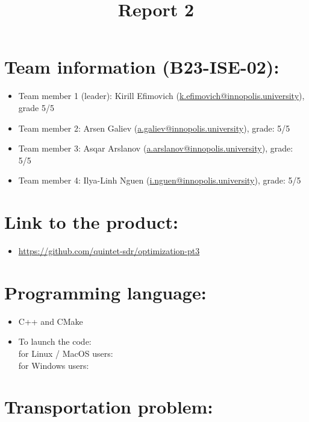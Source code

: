 \documentclass{article}
\title{\textbf{Report 2}}
\author{}
\date{}
\begin{document}
\maketitle

\thispagestyle{fancy}

\section*{Team information (B23-ISE-02):}
\begin{itemize}
\item Team member 1 (leader): Kirill Efimovich (\href{mailto:k.efimovich@innopolis.university}{k.efimovich@innopolis.university}), grade 5/5
\item Team member 2: Arsen Galiev (\href{mailto:a.galiev@innopolis.university}{a.galiev@innopolis.university}), grade: 5/5
\item Team member 3: Asqar Arslanov (\href{mailto:a.arslanov@innopolis.university}{a.arslanov@innopolis.university}), grade: 5/5
\item Team member 4: Ilya-Linh Nguen (\href{mailto:i.nguen@innopolis.university}{i.nguen@innopolis.university}), grade: 5/5
\end{itemize}

\section*{Link to the product:}

\begin{itemize}
\item \url{https://github.com/quintet-sdr/optimization-pt3}
\end{itemize}

\section*{Programming language:}

\begin{itemize}
\item C++ and CMake
\item To launch the code: \\
for Linux / MacOS users:  \\
for Windows users: 
\end{itemize}

\section*{Transportation problem:}
\end{document}
